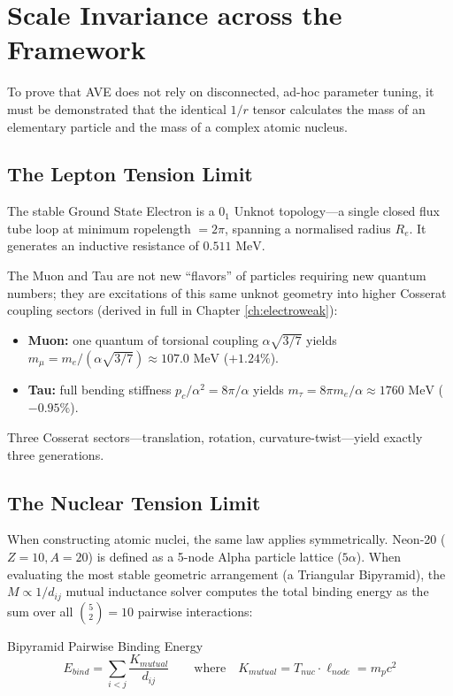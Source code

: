\section{Scale Invariance across the Framework}
To prove that AVE does not rely on disconnected, ad-hoc parameter tuning, it must be demonstrated that the identical $1/r$ tensor calculates the mass of an elementary particle and the mass of a complex atomic nucleus.

\subsection{The Lepton Tension Limit}
The stable Ground State Electron is a $0_1$ Unknot topology---a single closed flux tube loop at minimum ropelength $= 2\pi$, spanning a normalised radius $R_e$. It generates an inductive resistance of $0.511 \text{ MeV}$. 

The Muon and Tau are not new ``flavors'' of particles requiring new quantum numbers; they are excitations of this same unknot geometry into higher Cosserat coupling sectors (derived in full in Chapter \ref{ch:electroweak}):
\begin{itemize}
    \item \textbf{Muon:} one quantum of torsional coupling $\alpha\sqrt{3/7}$ yields $m_\mu = m_e/(\alpha\sqrt{3/7}) \approx 107.0 \text{ MeV}$ ($+1.24\%$).
    \item \textbf{Tau:} full bending stiffness $p_c/\alpha^2 = 8\pi/\alpha$ yields $m_\tau = 8\pi m_e / \alpha \approx 1760 \text{ MeV}$ ($-0.95\%$).
\end{itemize}
Three Cosserat sectors---translation, rotation, curvature-twist---yield exactly three generations.

\subsection{The Nuclear Tension Limit}
When constructing atomic nuclei, the same law applies symmetrically. Neon-20 ($Z=10, A=20$) is defined as a 5-node Alpha particle lattice ($5\alpha$). When evaluating the most stable geometric arrangement (a Triangular Bipyramid), the $M \propto 1/d_{ij}$ mutual inductance solver computes the total binding energy as the sum over all $\binom{5}{2} = 10$ pairwise interactions:
\begin{resultbox}{Bipyramid Pairwise Binding Energy}
\begin{equation}
    E_{bind} = \sum_{i<j} \frac{K_{mutual}}{d_{ij}} \qquad \text{where} \quad K_{mutual} = T_{nuc} \cdot \ell_{node} = m_p c^2
\end{equation}
\end{resultbox}

